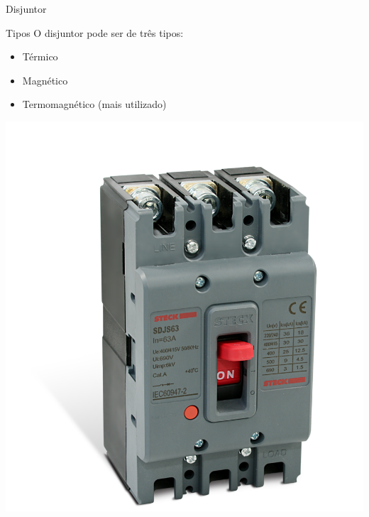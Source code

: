 \begin{frame}{Disjuntor}
	\begin{block}{Tipos}
		O disjuntor pode ser de três tipos:
		\begin{itemize}
			\item Térmico
			\item Magnético
			\item Termomagnético (mais utilizado)
		\end{itemize}
	\end{block}

	\vspace{0.25cm}

	\begin{minipage}{0.3\linewidth}
		\centering
		\includegraphics[width=1\linewidth]{Figuras/Ch04/fig7}
	\end{minipage}\hfill
	\begin{minipage}{0.3\linewidth}
		\centering

\end{minipage}
\end{frame}
